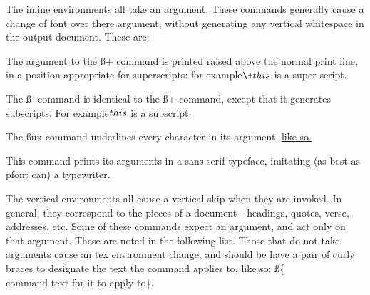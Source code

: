 The inline environments all take an argument. These commands
generally cause a change of font over there argument, without
generating any vertical whitespace in the output document. These
are:

{\describe

\bold{+} The argument to the {\ss +} command is printed
raised above the normal print line, in a position appropriate for
superscripts: for example$\+{this}$ is a super script.

\bold{-} The {\ss -} command is identical to the {\ss +} command,
except that it generates subscripts. For example$\-{this}$ is a subscript.

 The {\ss ux} command underlines every character in its
argument, \underline{like so.}{}

 This command prints its arguments in a sans-serif
typeface, imitating (as best as pfont can) a typewriter.
}			%


The vertical environments all cause a vertical skip when they are
invoked. In general, they correspond to the pieces of a document
- headings, quotes, verse, addresses, etc.  Some of these
commands expect an argument, and act only on that argument.
These are noted in the following list. Those that do not take
arguments cause an tex environment change, and should be have
a pair of curly braces to designate the text the command applies
to, like so: {\ss \{\\command text for it to apply to\}.}

